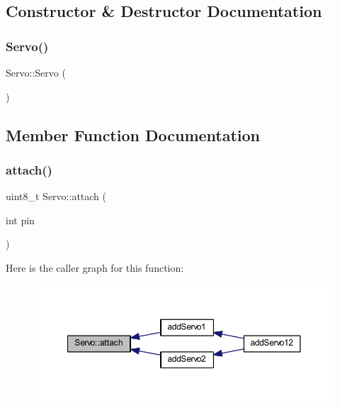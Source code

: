\subsection{Constructor \& Destructor Documentation}
\mbox{\label{class_servo_a70b2b17657cf258cdcb57503bcf62cd2}} 
\subsubsection{\texorpdfstring{Servo()}{Servo()}}
{\footnotesize\ttfamily Servo\+::\+Servo (\begin{DoxyParamCaption}{ }\end{DoxyParamCaption})}



\subsection{Member Function Documentation}
\mbox{\label{class_servo_aeccd2077f07ebc45250da14e72a0c461}} 
\subsubsection{\texorpdfstring{attach()}{attach()}\hspace{0.1cm}{\footnotesize\ttfamily [1/2]}}
{\footnotesize\ttfamily uint8\+\_\+t Servo\+::attach (\begin{DoxyParamCaption}\item[{int}]{pin }\end{DoxyParamCaption})}

Here is the caller graph for this function\+:
\nopagebreak
\begin{figure}[H]
\begin{center}
\leavevmode
\includegraphics[width=350pt]{d2/d3c/class_servo_aeccd2077f07ebc45250da14e72a0c461_icgraph}
\end{center}
\end{figure}
\mbox{\label{class_servo_a70076d9a77de97241badd1f377817219}} 

